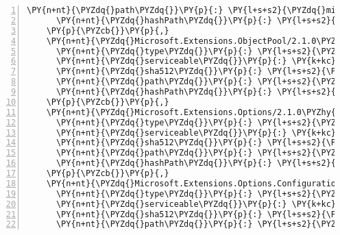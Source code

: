 \begin{Verbatim}[commandchars=\\\{\},numbers=left,firstnumber=1,stepnumber=1,numberblanklines=0]
      \PY{n+nt}{\PYZdq{}path\PYZdq{}}\PY{p}{:} \PY{l+s+s2}{\PYZdq{}microsoft.extensions.logging.tracesource/2.1.0\PYZhy{}rc1\PYZhy{}final\PYZdq{}}\PY{p}{,}
      \PY{n+nt}{\PYZdq{}hashPath\PYZdq{}}\PY{p}{:} \PY{l+s+s2}{\PYZdq{}microsoft.extensions.logging.tracesource.2.1.0\PYZhy{}rc1\PYZhy{}final.nupkg.sha512\PYZdq{}}
    \PY{p}{\PYZcb{}}\PY{p}{,}
    \PY{n+nt}{\PYZdq{}Microsoft.Extensions.ObjectPool/2.1.0\PYZhy{}rc1\PYZhy{}final\PYZdq{}}\PY{p}{:} \PY{p}{\PYZob{}}
      \PY{n+nt}{\PYZdq{}type\PYZdq{}}\PY{p}{:} \PY{l+s+s2}{\PYZdq{}package\PYZdq{}}\PY{p}{,}
      \PY{n+nt}{\PYZdq{}serviceable\PYZdq{}}\PY{p}{:} \PY{k+kc}{true}\PY{p}{,}
      \PY{n+nt}{\PYZdq{}sha512\PYZdq{}}\PY{p}{:} \PY{l+s+s2}{\PYZdq{}sha512\PYZhy{}6mNworFhz8PPfp+J2rSxrH47VykVc5fESjfdfjOaALOfLy5Hv1nWi5b38b8OWO+qq8dgWrj0hYJi+YBI8I/X9g==\PYZdq{}}\PY{p}{,}
      \PY{n+nt}{\PYZdq{}path\PYZdq{}}\PY{p}{:} \PY{l+s+s2}{\PYZdq{}microsoft.extensions.objectpool/2.1.0\PYZhy{}rc1\PYZhy{}final\PYZdq{}}\PY{p}{,}
      \PY{n+nt}{\PYZdq{}hashPath\PYZdq{}}\PY{p}{:} \PY{l+s+s2}{\PYZdq{}microsoft.extensions.objectpool.2.1.0\PYZhy{}rc1\PYZhy{}final.nupkg.sha512\PYZdq{}}
    \PY{p}{\PYZcb{}}\PY{p}{,}
    \PY{n+nt}{\PYZdq{}Microsoft.Extensions.Options/2.1.0\PYZhy{}rc1\PYZhy{}final\PYZdq{}}\PY{p}{:} \PY{p}{\PYZob{}}
      \PY{n+nt}{\PYZdq{}type\PYZdq{}}\PY{p}{:} \PY{l+s+s2}{\PYZdq{}package\PYZdq{}}\PY{p}{,}
      \PY{n+nt}{\PYZdq{}serviceable\PYZdq{}}\PY{p}{:} \PY{k+kc}{true}\PY{p}{,}
      \PY{n+nt}{\PYZdq{}sha512\PYZdq{}}\PY{p}{:} \PY{l+s+s2}{\PYZdq{}sha512\PYZhy{}qPwcJ8gHAacQBS3wCohv6cvlxF8VRfyZZNMIv3iv6dT4LrQwga37AZat+dn+7UOL7tZp2UtEowpqSosx49nsMA==\PYZdq{}}\PY{p}{,}
      \PY{n+nt}{\PYZdq{}path\PYZdq{}}\PY{p}{:} \PY{l+s+s2}{\PYZdq{}microsoft.extensions.options/2.1.0\PYZhy{}rc1\PYZhy{}final\PYZdq{}}\PY{p}{,}
      \PY{n+nt}{\PYZdq{}hashPath\PYZdq{}}\PY{p}{:} \PY{l+s+s2}{\PYZdq{}microsoft.extensions.options.2.1.0\PYZhy{}rc1\PYZhy{}final.nupkg.sha512\PYZdq{}}
    \PY{p}{\PYZcb{}}\PY{p}{,}
    \PY{n+nt}{\PYZdq{}Microsoft.Extensions.Options.ConfigurationExtensions/2.1.0\PYZhy{}rc1\PYZhy{}final\PYZdq{}}\PY{p}{:} \PY{p}{\PYZob{}}
      \PY{n+nt}{\PYZdq{}type\PYZdq{}}\PY{p}{:} \PY{l+s+s2}{\PYZdq{}package\PYZdq{}}\PY{p}{,}
      \PY{n+nt}{\PYZdq{}serviceable\PYZdq{}}\PY{p}{:} \PY{k+kc}{true}\PY{p}{,}
      \PY{n+nt}{\PYZdq{}sha512\PYZdq{}}\PY{p}{:} \PY{l+s+s2}{\PYZdq{}sha512\PYZhy{}hu8hsJqTpz/E2fkG1+bAjBzzYvlXay4kldQvVQZ5o352QzKofZS6dWJUcFE6GhnptqkX02o9QSNk1tuQEmAQkg==\PYZdq{}}\PY{p}{,}
      \PY{n+nt}{\PYZdq{}path\PYZdq{}}\PY{p}{:} \PY{l+s+s2}{\PYZdq{}microsoft.extensions.options.configurationextensions/2.1.0\PYZhy{}rc1\PYZhy{}final\PYZdq{}}\PY{p}{,}

\end{Verbatim}
